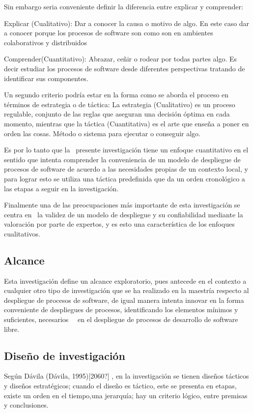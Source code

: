 Sin embargo seria conveniente definir la diferencia entre explicar y comprender:

Explicar (Cualitativo): Dar a conocer la causa o motivo de algo. En este caso dar a conocer porque los procesos de software son como son en ambientes colaborativos y distribuidos

Comprender(Cuantitativo): Abrazar, ceñir o rodear por todas partes algo. Es decir estudiar los procesos de software desde diferentes perspectivas tratando de identificar sus componentes.

Un segundo criterio podría estar en la forma como se aborda el proceso en términos de estrategia o de táctica: La estrategia (Cualitativo) es un proceso regulable, conjunto de las reglas que aseguran una decisión óptima en cada momento, mientras que la táctica (Cuantitativa) es el arte que enseña a poner en orden las cosas. Método o sistema para ejecutar o conseguir algo.

Es por lo tanto que la \ presente investigación tiene un enfoque cuantitativo en el sentido que intenta comprender la conveniencia de un modelo de despliegue de procesos de software de acuerdo a las necesidades propias de un contexto local, y para lograr esto se utiliza una táctica predefinida que da un orden cronológico a las etapas a seguir en la investigación.

Finalmente una de las preocupaciones más importante de esta investigación se centra en \ la validez de un modelo de despliegue y su confiabilidad mediante la valoración por parte de expertos, y es esto una característica de los enfoques cualitativos.

\subsection[Alcance]{Alcance}
Esta investigación define un alcance exploratorio, pues antecede en el contexto a cualquier otro tipo de investigación que se ha realizado en la maestría respecto al despliegue de procesos de software, de igual manera intenta innovar en la forma conveniente de despliegues de procesos, identificando los elementos mínimos y suficientes, necesarios \ \ en el despliegue de procesos de desarrollo de software libre.

\subsection{Diseño de investigación}
Según Dávila (Dávila, 1995)[2060?] , en la investigación se tienen diseños tácticos y diseños estratégicos; cuando el diseño es táctico, este se presenta en etapas, existe un orden en el tiempo,una jerarquía; hay un criterio lógico, entre premisas y conclusiones. 

